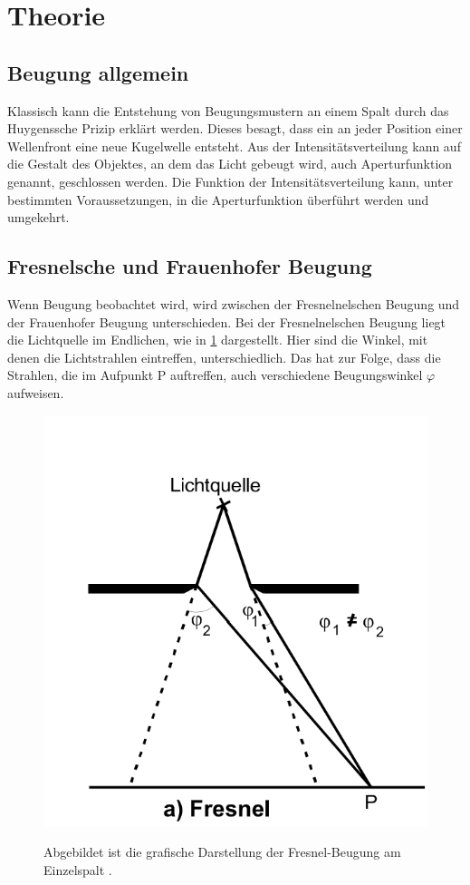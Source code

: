 \section{Theorie}
\label{sec:Theorie}
\subsection{Beugung allgemein}
Klassisch kann die Entstehung von Beugungsmustern an einem Spalt durch das Huygenssche Prizip erklärt werden.
Dieses besagt, dass ein an jeder Position einer Wellenfront eine neue Kugelwelle entsteht.
Aus der Intensitätsverteilung kann auf die Gestalt des Objektes, an dem das Licht gebeugt wird, auch Aperturfunktion genannt, geschlossen werden.
Die Funktion der Intensitätsverteilung kann, unter bestimmten Voraussetzungen, in die Aperturfunktion überführt werden und umgekehrt.

\subsection{Fresnelsche und Frauenhofer Beugung}
Wenn Beugung beobachtet wird, wird zwischen der Fresnelnelschen Beugung und der Frauenhofer Beugung unterschieden.
Bei der Fresnelnelschen Beugung liegt die Lichtquelle im Endlichen, wie in \ref{fig:Fresnel} dargestellt.
Hier sind die Winkel, mit denen die Lichtstrahlen eintreffen, unterschiedlich. 
Das hat zur Folge, dass die Strahlen, die im Aufpunkt P auftreffen, auch verschiedene Beugungswinkel $\varphi$ aufweisen.

\begin{figure}[H]
    \centering
    \caption{Abgebildet ist die grafische Darstellung der Fresnel-Beugung am Einzelspalt \cite{V406}.}
    \includegraphics{Bilder/Fresnel.png}
    \label{fig:Fresnel}
\end{figure}

